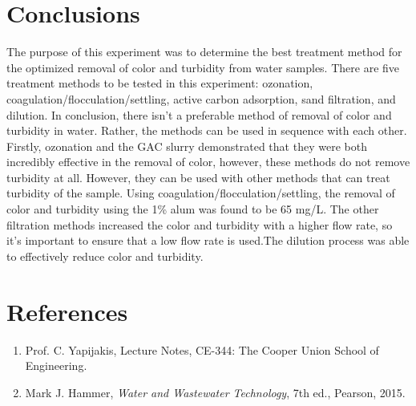 \documentclass{article}
\begin{document}
    \section{Conclusions}
    \indent The purpose of this experiment was to determine the best treatment method for the optimized removal of color and turbidity from water samples. There are five treatment methods to be tested in this experiment: ozonation, coagulation/flocculation/settling, active carbon adsorption, sand filtration, and dilution. In conclusion, there isn't a preferable method of removal of color and turbidity in water. Rather, the methods can be used in sequence with each other.\\
    \indent Firstly, ozonation and the GAC slurry demonstrated that they were both incredibly effective in the removal of color, however, these methods do not remove turbidity at all. However, they can be used with other methods that can treat turbidity of the sample. Using coagulation/flocculation/settling, the removal of color and turbidity using the 1\% alum was found to be 65 mg/L. The other filtration methods increased the color and turbidity with a higher flow rate, so it's important to ensure that a low flow rate is used.The dilution process was able to effectively reduce color and turbidity.
    \newpage
    \section{References}
    \begin{enumerate}
        \item Prof. C. Yapijakis, Lecture Notes, CE-344: The Cooper Union School of Engineering.
        \item Mark J. Hammer, \emph{Water and Wastewater Technology}, 7th ed., Pearson, 2015.
    \end{enumerate}
    \newpage    
\end{document}
